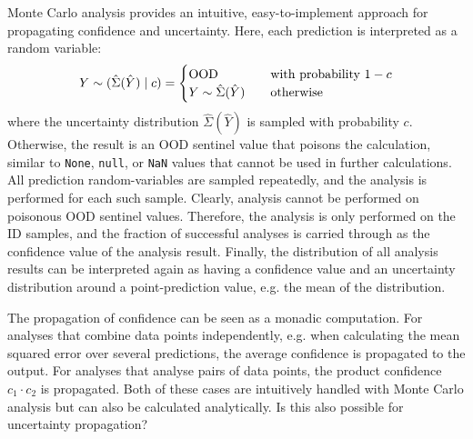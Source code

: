 \newpar Monte Carlo analysis provides an intuitive, easy-to-implement approach for propagating confidence and uncertainty. Here, each prediction is interpreted as a random variable:
\begin{equation*}
    Y \sim (\hat{\Sigma}(\hat{Y}) \mathrel{|} c) = \begin{cases}
        \text{OOD} &\quad \text{with probability } 1-c \\
        Y \sim \hat{\Sigma}(\hat{Y}) &\quad \text{otherwise}
    \end{cases}
\end{equation*}
where the uncertainty distribution $\hat{\Sigma}(\hat{Y})$ is sampled with probability $c$. Otherwise, the result is an OOD sentinel value that poisons the calculation, similar to \texttt{None}, \texttt{null}, or \texttt{NaN} values that cannot be used in further calculations. All prediction random-variables are sampled repeatedly, and the analysis is performed for each such sample. Clearly, analysis cannot be performed on poisonous OOD sentinel values. Therefore, the analysis is only performed on the ID samples, and the fraction of successful analyses is carried through as the confidence value of the analysis result. Finally, the distribution of all analysis results can be interpreted again as having a confidence value and an uncertainty distribution around a point-prediction value, e.g. the mean of the distribution.

\newpar The propagation of confidence can be seen as a monadic computation. For analyses that combine data points independently, e.g. when calculating the mean squared error over several predictions, the average confidence is propagated to the output. For analyses that analyse pairs of data points, the product confidence $c_1 \cdot c_2$ is propagated. Both of these cases are intuitively handled with Monte Carlo analysis but can also be calculated analytically. Is this also possible for uncertainty propagation?

